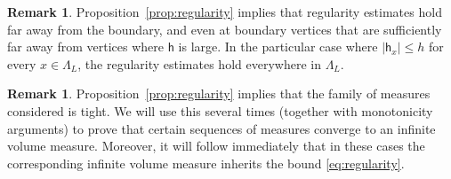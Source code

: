 \documentclass[11pt,a4paper]{article}
\theoremstyle{definition}
\newtheorem{remark}[theorem]{Remark}
\numberwithin{equation}{section}
\begin{document}
\begin{remark}\label{rem:boundary regularity}
 Proposition~\textup{\ref{prop:regularity}} implies that regularity estimates hold far away from the boundary, and even at boundary vertices that are sufficiently far away from vertices where $\mathsf{h}$ is large. In the particular case where $|\mathsf{h}_x|\leq h$ for every $x\in \Lambda_L$, the regularity estimates hold everywhere in $\Lambda_L$. 
\end{remark}
\begin{remark}\label{rem:tightness}
 Proposition~\textup{\ref{prop:regularity}} implies that the family of measures considered is tight. We will use this several times (together with monotonicity arguments) to prove that certain sequences of measures converge to an infinite volume measure. Moreover, it will follow immediately that in these cases the corresponding infinite volume measure inherits the bound \eqref{eq:regularity}.
\end{remark}
\end{document}
